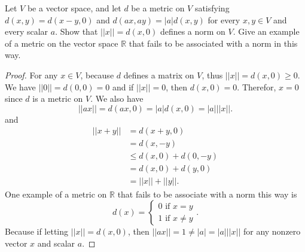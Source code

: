 \documentclass[12pt, a4paper]{article}
\theoremstyle{plain}
\newcommand{\R}{\mathbb{R}}
\begin{document}
\begin{exercise}{16}
Let $V$ be a vector space, and let $d$ be a metric on $V$ satisfying $d(x,y)=d(x-y,0)$ and $d(ax,ay)=|a|d(x,y)$ for every $x,y\in V$ and every scalar $a$. Show that $||x||=d(x,0)$ defines a norm on $V$. Give an example of a metric on the vector space $\R$ that fails to be associated with a norm in this way.
\end{exercise}
	\begin{proof}
	For any $x\in V$, because $d$ defines a matrix on $V$, thus $||x||=d(x,0)\geq 0$. We have $||0||=d(0,0)=0$ and if $||x||=0$, then $d(x,0)=0$. Therefor, $x=0$ since $d$ is a metric on $V$. We also have 
	\[
	||ax||=d(ax,0)=|a|d(x,0)=|a|||x||.
	\]
	and
	\begin{align*}
	||x+y||&=d(x+y,0)\\
	&= d(x,-y)\\
	&\leq d(x,0)+d(0,-y)\\
	&=d(x,0)+d(y,0)\\
	&=||x||+||y||.
	\end{align*}
	One example of a metric on $\R$ that fails to be associate with a norm this way is 
	\[
	d(x)=\left\{
	\begin{array}{lr}
	0 \text{ if } x=y\\
	1 \text{ if } x\neq y
	\end{array}\right..
	\]
	Because if letting $||x||=d(x,0)$, then $||ax||=1\neq |a|=|a|||x||$ for any nonzero vector $x$ and scalar $a$.
	\end{proof}
	
\pagebreak
\end{document}
